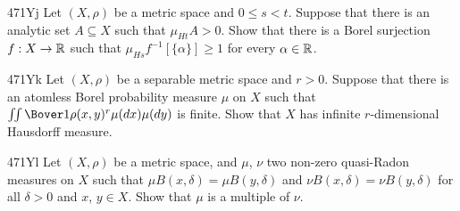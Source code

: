 {\spheader 471Yj Let $(X,\rho)$ be a metric space and $0\le s<t$.
Suppose that there is an analytic set $A\subseteq X$ such that
$\mu_{Ht}A>0$.
Show that there is a Borel surjection $f:X\to\Bbb R$ such that
$\mu_{Hs}f^{-1}[\{\alpha\}]\ge 1$ for every $\alpha\in\Bbb R$.

\spheader 471Yk Let $(X,\rho)$ be a separable metric space and
$r>0$.   Suppose that there is an atomless Borel probability measure $\mu$
on $X$ such that $\iint\Bover1{\rho(x,y)^r}\mu(dx)\mu(dy)$ is finite.
Show that $X$ has infinite $r$-dimensional Hausdorff measure.

\spheader 471Yl Let $(X,\rho)$ be a metric space, and $\mu$,
$\nu$ two non-zero quasi-Radon measures on $X$
such that $\mu B(x,\delta)=\mu B(y,\delta)$
and $\nu B(x,\delta)=\nu B(y,\delta)$ for all $\delta>0$ and $x$, $y\in X$.
Show that $\mu$ is a multiple of $\nu$.   
}%

